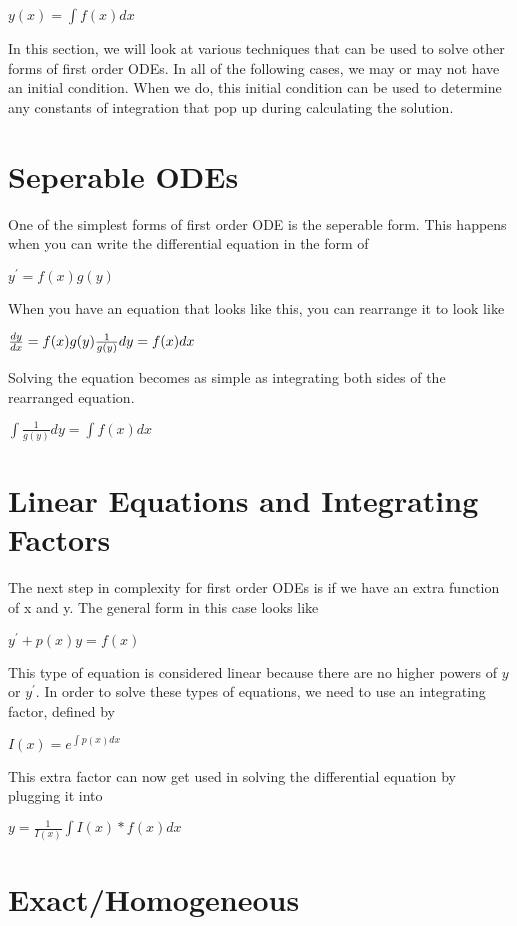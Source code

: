 \documentclass[
  letterpaper,
]{report}
\begin{document}
\(y(x) = \int f(x) dx\)

In this section, we will look at various techniques that can be used to
solve other forms of first order ODEs. In all of the following cases, we
may or may not have an initial condition. When we do, this initial
condition can be used to determine any constants of integration that pop
up during calculating the solution.

\section{Seperable ODEs}\label{seperable-odes}

One of the simplest forms of first order ODE is the seperable form. This
happens when you can write the differential equation in the form of

\(y^{'} = f(x) g(y)\)

When you have an equation that looks like this, you can rearrange it to
look like

\(\frac{dy}{dx} = f(x) g(y) \\
\frac{1}{g(y)} dy = f(x) dx\)

Solving the equation becomes as simple as integrating both sides of the
rearranged equation.

\(\int \frac{1}{g(y)} dy = \int f(x) dx\)

\section{Linear Equations and Integrating
Factors}\label{linear-equations-and-integrating-factors}

The next step in complexity for first order ODEs is if we have an extra
function of x and y. The general form in this case looks like

\(y^{'} + p(x) y = f(x)\)

This type of equation is considered linear because there are no higher
powers of \(y\) or \(y^{'}\). In order to solve these types of
equations, we need to use an integrating factor, defined by

\(I(x) = e^{\int p(x) dx}\)

This extra factor can now get used in solving the differential equation
by plugging it into

\(y = \frac{1}{I(x)} \int I(x) * f(x) dx\)

\section{Exact/Homogeneous}\label{exacthomogeneous}
\end{document}
